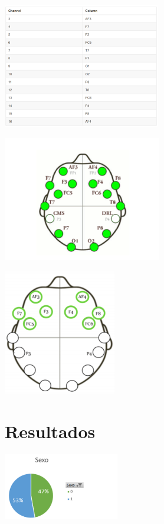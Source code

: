 \begin{center}
\includegraphics[height=2.15in]{figuras/Imagen4.png}
\end{center}

\begin{center}
\includegraphics[height=2.15in]{figuras/Imagen3.png}
\end{center}

\begin{center}
\includegraphics[height=2.15in]{figuras/Imagen2.png}
\end{center}




\chapter{Resultados}

\begin{center}
\includegraphics[height=1.15in]{figuras/Imagen11.png}
\end{center}

